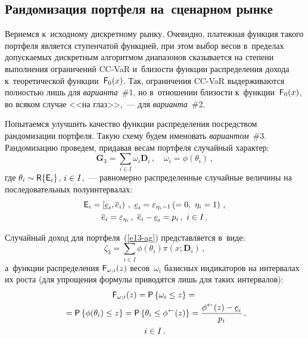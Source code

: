 \begin{multicols}{2}
  \section{Рандомизация портфеля на~сценарном рынке}
  
  Вернемся к~исходному дискретному рынку. Очевидно, платежная функция 
такого портфеля является ступенчатой функцией, при этом выбор весов 
в~пределах допускаемых дискретным алгоритмом диапазонов сказывается на 
степени выполнения ограничений CC-VaR и~близости функции распределения 
дохода к~теоретической функции~${\sf F}_0(x)$. Так, ограничения CC-VaR 
выдерживаются пол\-ностью лишь для \textit{варианта}~\#1, но в~отношении 
бли\-зости к~функции~${\sf F}_0(x)$, во всяком случае <<на глаз>>,~--- для 
\textit{варианта}~\#2. 
  
  Попытаемся улучшить качество функции распределения посредством 
рандомизации портфеля. Такую схему будем именовать \textit{вариантом}~\#3. 
Рандомизацию проведем, придавая весам портфеля случайный характер:
  \begin{equation}
  \mathbf{G}_3=\sum\limits_{i\in I} \omega_i \mathbf{D}_i\,,\quad \omega_i=\phi(\theta_i)\,,
  \label{e13-ag}
  \end{equation}
где $\theta_i\sim {\sf R}\{{\sf E}_i\}$, $i\hm\in I$,~--- равномерно 
распределенные случайные величины на последовательных полуинтервалах: 
\begin{multline*}
  {\sf E}_i=\left[ \underline{e}_i, \overline{e}_i\right)\,,\ 
\underline{e}_i=\varepsilon_{\eta_i-1}\left( =0,\ \eta_i=1\right)\,,\\
 \overline{e}_i 
=\varepsilon_{\eta_i}\,,\ \overline{e}_i-\underline{e}_i=p_i\,,\ i\in I\,.
\end{multline*}
  
  Случайный доход для портфеля~(\ref{e13-ag}) представляется в~виде:
  $$
  \zeta_3=\sum\limits_{i\in I} \phi(\theta_i)\pi(x;\mathbf{D}_i)\,,
  $$
а~функции распределения ${\sf F}_{\omega;i}(z)$ весов~$\omega_i$ 
базисных индикаторов на интервалах их роста (для упрощения формулы 
приводятся лишь для таких интервалов):
\begin{multline*}
  {\sf F}_{\omega;i} (z) ={\sf P}\left\{ \omega_i\leq z\right\} ={}\\
  {}={\sf P}\left\{ 
\phi(\theta_i) \leq z\right\} ={\sf P} \left\{ \theta_i\leq \phi^{\leftarrow}(z)\right\} 
=\displaystyle\frac{\displaystyle \phi^{\leftarrow}(z)-\underline{e}_i\mathstrut}{\displaystyle p_i\mathstrut}\,,\\
 i\in I\,.
  \end{multline*}
  

\end{multicols}

